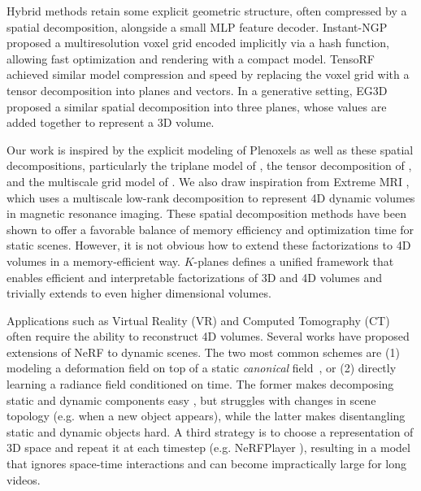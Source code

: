 \documentclass[10pt,twocolumn,letterpaper]{article}
\makeatletter
\newcommand{\Modelname}{$K$-planes}
\renewcommand{\paragraph}{\@startsection{paragraph}{4}{\z@}{0.65ex \@plus 1ex \@minus .2ex}{-1em}{\normalfont \normalsize \bfseries }}
\makeatother
\begin{document}
Hybrid methods \cite{dvgo, ingp, tensorf} retain some explicit geometric structure, often compressed by a spatial decomposition, alongside a small MLP feature decoder. Instant-NGP \cite{ingp} proposed a multiresolution voxel grid encoded implicitly via a hash function, allowing fast optimization and rendering with a compact model. TensoRF \cite{tensorf} achieved similar model compression and speed by replacing the voxel grid with a tensor decomposition into planes and vectors. In a generative setting, EG3D \cite{triplane} proposed a similar spatial decomposition into three planes, whose values are added together to represent a 3D volume. 

Our work is inspired by the explicit modeling of Plenoxels as well as these spatial decompositions, particularly the triplane model of \cite{triplane}, the tensor decomposition of \cite{tensorf}, and the multiscale grid model of \cite{ingp}. We also draw inspiration from Extreme MRI \cite{extreme_mri}, which uses a multiscale low-rank decomposition to represent 4D dynamic volumes in magnetic resonance imaging. These spatial decomposition methods have been shown to offer a favorable balance of memory efficiency and optimization time for static scenes. However, it is not obvious how to extend these factorizations to 4D volumes in a memory-efficient way. \Modelname{} defines a unified framework that enables efficient and interpretable factorizations of 3D and 4D volumes and trivially extends to even higher dimensional volumes.


\paragraph{Dynamic volumes.}
Applications such as Virtual Reality (VR) and Computed Tomography (CT) often require the ability to reconstruct 4D volumes. Several works have proposed extensions of NeRF to dynamic scenes. The two most common schemes are (1) modeling a deformation field on top of a static \emph{canonical} field~\cite{dnerf, nrnerf, nerfies, Du4d2021, yuan2021star, tineuvox, nsff}, or (2) directly learning a radiance field conditioned on time\cite{xian2021space, nsff, gao2021, dynerf, hypernerf}. The former makes decomposing static and dynamic components easy \cite{yuan2021star, d2nerf}, but struggles with changes in scene topology (e.g. when a new object appears), while the latter makes disentangling static and dynamic objects hard.
A third strategy is to choose a representation of 3D space and repeat it at each timestep (e.g. NeRFPlayer \cite{nerfplayer}), resulting in a model that ignores space-time interactions and can become impractically large for long videos. 
\end{document}
